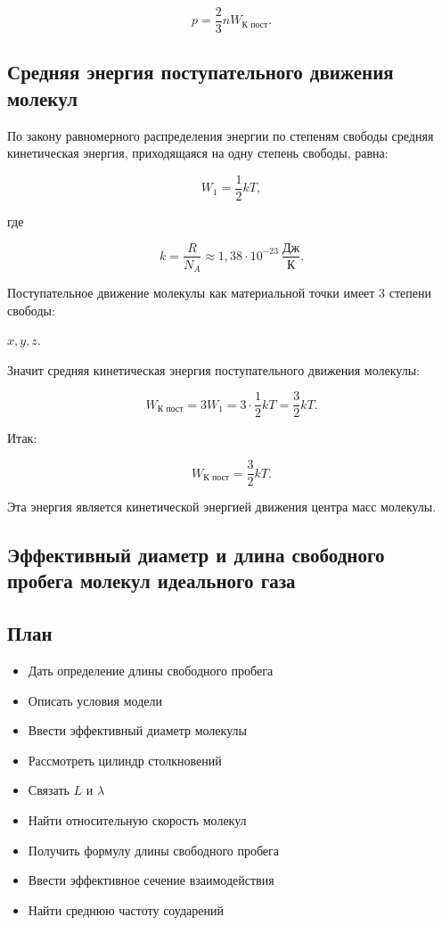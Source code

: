 \documentclass[a4paper,12pt]{article}
\begin{document}
\begin{theorembox}
\[
p=\frac{2}{3}nW_{\text{К пост}}.
\]
\end{theorembox}

\subsection*{Средняя энергия поступательного движения молекул}

По закону равномерного распределения энергии по степеням свободы средняя кинетическая энергия, приходящаяся на одну степень свободы, равна:

\[
W_1=\frac{1}{2}kT,
\]

где

\[
k=\frac{R}{N_A}\approx1{,}38\cdot10^{-23}\ \frac{\text{Дж}}{\text{К}}.
\]

Поступательное движение молекулы как материальной точки имеет $3$ степени свободы:

$x,y,z$.

Значит средняя кинетическая энергия поступательного движения молекулы:

\[
W_{\text{К пост}}=3W_1=3\cdot \frac{1}{2}kT=\frac{3}{2}kT.
\]

Итак:



\[
W_{\text{К пост}}=\frac{3}{2}kT.
\]

Эта энергия является кинетической энергией движения центра масс молекулы.

\subsection{Эффективный диаметр и длина свободного пробега молекул идеального газа}

\subsection*{План}
\begin{itemize}
\item Дать определение длины свободного пробега
\item Описать условия модели
\item Ввести эффективный диаметр молекулы
\item Рассмотреть цилиндр столкновений
\item Связать $L$ и $\lambda$
\item Найти относительную скорость молекул
\item Получить формулу длины свободного пробега
\item Ввести эффективное сечение взаимодействия
\item Найти среднюю частоту соударений
\end{itemize}
\end{document}
